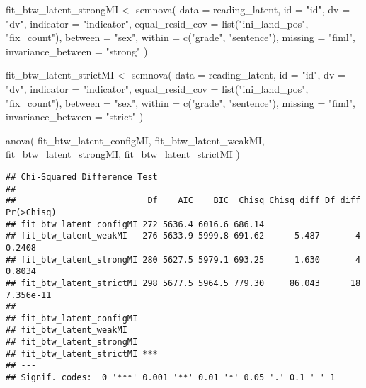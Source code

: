 \documentclass[
]{book}
\newenvironment{Shaded}{\begin{snugshade}}{\end{snugshade}}
\newcommand{\AttributeTok}[1]{\textcolor[rgb]{0.77,0.63,0.00}{#1}}
\newcommand{\FunctionTok}[1]{\textcolor[rgb]{0.00,0.00,0.00}{#1}}
\newcommand{\NormalTok}[1]{#1}
\newcommand{\OtherTok}[1]{\textcolor[rgb]{0.56,0.35,0.01}{#1}}
\newcommand{\StringTok}[1]{\textcolor[rgb]{0.31,0.60,0.02}{#1}}
\begin{document}
\begin{Shaded}
\begin{Highlighting}[]
\NormalTok{fit\_btw\_latent\_strongMI }\OtherTok{\textless{}{-}} \FunctionTok{semnova}\NormalTok{(}
    \AttributeTok{data =}\NormalTok{ reading\_latent,}
    \AttributeTok{id =} \StringTok{"id"}\NormalTok{, }
    \AttributeTok{dv =} \StringTok{"dv"}\NormalTok{,}
    \AttributeTok{indicator =} \StringTok{"indicator"}\NormalTok{,}
    \AttributeTok{equal\_resid\_cov =} \FunctionTok{list}\NormalTok{(}\StringTok{"ini\_land\_pos"}\NormalTok{, }\StringTok{"fix\_count"}\NormalTok{),}
    \AttributeTok{between =} \StringTok{"sex"}\NormalTok{,}
    \AttributeTok{within =} \FunctionTok{c}\NormalTok{(}\StringTok{"grade"}\NormalTok{, }\StringTok{"sentence"}\NormalTok{),}
    \AttributeTok{missing =} \StringTok{"fiml"}\NormalTok{,}
    \AttributeTok{invariance\_between =} \StringTok{"strong"}
\NormalTok{)}

\NormalTok{fit\_btw\_latent\_strictMI }\OtherTok{\textless{}{-}} \FunctionTok{semnova}\NormalTok{(}
    \AttributeTok{data =}\NormalTok{ reading\_latent,}
    \AttributeTok{id =} \StringTok{"id"}\NormalTok{, }
    \AttributeTok{dv =} \StringTok{"dv"}\NormalTok{,}
    \AttributeTok{indicator =} \StringTok{"indicator"}\NormalTok{,}
    \AttributeTok{equal\_resid\_cov =} \FunctionTok{list}\NormalTok{(}\StringTok{"ini\_land\_pos"}\NormalTok{, }\StringTok{"fix\_count"}\NormalTok{),}
    \AttributeTok{between =} \StringTok{"sex"}\NormalTok{,}
    \AttributeTok{within =} \FunctionTok{c}\NormalTok{(}\StringTok{"grade"}\NormalTok{, }\StringTok{"sentence"}\NormalTok{),}
    \AttributeTok{missing =} \StringTok{"fiml"}\NormalTok{,}
    \AttributeTok{invariance\_between =} \StringTok{"strict"}
\NormalTok{)}

\FunctionTok{anova}\NormalTok{(}
\NormalTok{    fit\_btw\_latent\_configMI, }
\NormalTok{    fit\_btw\_latent\_weakMI,}
\NormalTok{    fit\_btw\_latent\_strongMI,}
\NormalTok{    fit\_btw\_latent\_strictMI}
\NormalTok{)}
\end{Highlighting}
\end{Shaded}

\begin{verbatim}
## Chi-Squared Difference Test
## 
##                          Df    AIC    BIC  Chisq Chisq diff Df diff Pr(>Chisq)
## fit_btw_latent_configMI 272 5636.4 6016.6 686.14                              
## fit_btw_latent_weakMI   276 5633.9 5999.8 691.62      5.487       4     0.2408
## fit_btw_latent_strongMI 280 5627.5 5979.1 693.25      1.630       4     0.8034
## fit_btw_latent_strictMI 298 5677.5 5964.5 779.30     86.043      18  7.356e-11
##                            
## fit_btw_latent_configMI    
## fit_btw_latent_weakMI      
## fit_btw_latent_strongMI    
## fit_btw_latent_strictMI ***
## ---
## Signif. codes:  0 '***' 0.001 '**' 0.01 '*' 0.05 '.' 0.1 ' ' 1
\end{verbatim}
\end{document}
